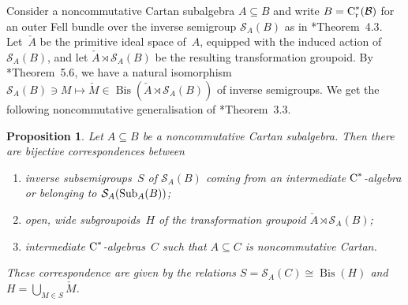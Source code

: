 \documentclass[a4paper]{amsart}
\theoremstyle{plain}
\newtheorem{lemma}[theorem]{Lemma}
\newtheorem{proposition}[theorem]{Proposition}
\theoremstyle{definition}
\theoremstyle{remark}
\numberwithin{theorem}{section}
\numberwithin{equation}{section}
\DeclareMathOperator{\Bis}{Bis}%
\DeclareMathOperator*{\clsp}{\overline{span}} %
\newcommand*{\nb}{\nobreakdash}
\newcommand*{\red}{\mathrm{r}}%
\newcommand*{\Cst}{\textup C^*}%
\newcommand*{\Slice}{\mathcal S}%
\newcommand*{\Sub}{\textup{Sub}}%
\newcommand*{\B}{\mathcal B}%
\newcommand*{\defeq}{\mathrel{\vcentcolon=}}%
\begin{document}

Consider a noncommutative Cartan subalgebra \(A\subseteq B\) and write
\(B= \Cst_\red(\B)\) for an outer  Fell bundle over the inverse
semigroup \( \Slice_A(B)\) as in
\cite{Kwasniewski-Meyer:Cartan}*{Theorem~4.3}.
Let~\(\check{A}\) be the primitive ideal space of~\(A\), equipped with
the induced action of~\(\Slice_A(B)\), and let \(\check{A}\rtimes  \Slice_A(B)\) be the
resulting transformation groupoid.
By \cite{Kwasniewski-Meyer:Cartan}*{Theorem~5.6}, we have a
natural isomorphism \(\Slice_A(B)\ni M\mapsto \check{M}\in
\Bis(\check{A}\rtimes  \Slice_A(B))\) of inverse semigroups.
We get the following  noncommutative generalisation of
\cite{Brown-Exel-Fuller-Pitts-Reznikoff:Intermediate}*{Theorem~3.3}.

\begin{proposition}
  \label{pro:ncCartan_range_Galois}
  Let \(A\subseteq B\) be a noncommutative Cartan subalgebra.
  Then there are bijective correspondences between
  \begin{enumerate}
  \item\label{enu:ncCartan_range_Galois1}%
    inverse subsemigroups~\(S\) of \(\Slice_A(B)\) coming from an
    intermediate \(\Cst\)\nb-algebra or belonging to
    \(\Slice_A(\Sub_A(B))\);
  \item\label{enu:ncCartan_range_Galois2}%
    open, wide subgroupoids~\(H\) of the transformation groupoid
    \(\check{A}\rtimes  \Slice_A(B)\);
  \item\label{enu:ncCartan_range_Galois3}%
    intermediate \(\Cst\)-algebras~\(C\) such that  \(A\subseteq C\)
    is noncommutative Cartan.
  \end{enumerate}
  These correspondence are given by the relations
  \(
  S=\Slice_A(C)\cong \Bis(H)
  \) and \(H=\bigcup_{M\in S} \check{M}\).
\end{proposition}
\end{document}
